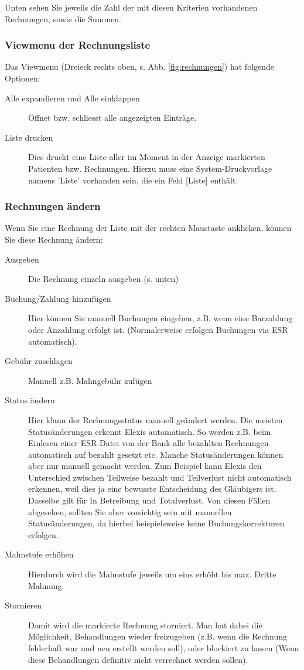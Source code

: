 Unten sehen Sie jeweils die Zahl der mit diesen Kriterien vorhandenen Rechnungen, sowie die Summen.
\subsubsection{Viewmenu der Rechnungsliste}
Das Viewmenu (Dreieck rechts oben, s. Abb. \ref{fig:rechnungen}) hat folgende Optionen:
\begin{description}
\item [Alle expandieren und Alle einklappen] Öffnet bzw. schliesst alle angezeigten Einträge.
\item [Liste drucken] Dies druckt eine Liste aller im Moment in der Anzeige markierten Patienten bzw. Rechnungen. Hierzu muss eine System-Druckvorlage namens 'Liste' vorhanden sein, die ein Feld [Liste] enthält.
\end{description}
\subsubsection{Rechnungen ändern}
Wenn Sie eine Rechnung der Liste mit der rechten Maustaste anklicken, können Sie diese Rechnung ändern:
\begin{description}
\item [Ausgeben] Die Rechnung einzeln ausgeben (s. unten)
\item [Buchung/Zahlung hinzufügen] Hier können Sie manuell Buchungen eingeben, z.B. wenn eine Barzahlung oder Anzahlung erfolgt ist. (Normalerweise erfolgen Buchungen via ESR automatisch).
\item [Gebühr zuschlagen] Manuell z.B. Mahngebühr zufügen
\item [Status ändern] Hier klann der Rechnungsstatus manuell geändert werden. Die meisten Statusänderungen erkennt Elexis automatisch. So werden z.B. beim Einlesen einer ESR-Datei von der Bank alle bezahlten Rechnungen automatisch auf \glqq bezahlt\grqq{} gesetzt etc. Manche Statusänderungen können aber nur manuell gemacht werden. Zum Beispiel kann Elexis den Unterschied zwischen \glqq Teilweise bezahlt\grqq{} und \glqq Teilverlust\grqq{} nicht automatisch erkennen, weil dies ja eine bewusste Entscheidung des Gläubigers ist. Dasselbe gilt für \glqq In Betreibung\grqq{} und \glqq Totalverlust\grqq{}.
    Von diesen Fällen abgesehen, sollten Sie aber vorsichtig sein mit manuellen Statusänderungen, da hierbei beispielsweise keine Buchungskorrekturen erfolgen.
\item [Mahnstufe erhöhen] Hierdurch wird die Mahnstufe jeweils um eins erhöht bis max. Dritte Mahnung.
\item [Stornieren] Damit wird die markierte Rechnung storniert. Man hat dabei die Möglichkeit, Behandlungen wieder freizugeben (z.B. wenn die Rechnung fehlerhaft war und neu erstellt werden soll), oder blockiert zu lassen (Wenn diese Behandlungen definitiv nicht verrechnet werden sollen).
\end{description}

